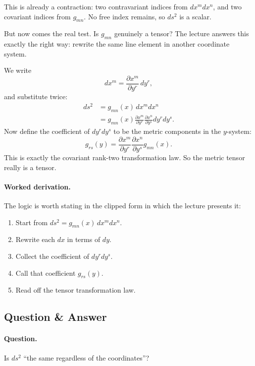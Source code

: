 This is already a contraction: two contravariant indices from \(dx^m dx^n\), and two covariant indices from \(g_{mn}\). No free index remains, so \(ds^2\) is a scalar.

But now comes the real test. Is \(g_{mn}\) genuinely a tensor? The lecture answers this exactly the right way: rewrite the same line element in another coordinate system.

We write
\begin{equation}
dx^m=\frac{\partial x^m}{\partial y^r}\,dy^r,
\end{equation}
and substitute twice:
\begin{align}
ds^2
&=g_{mn}(x)\,dx^m dx^n \\
&=
g_{mn}(x)
\frac{\partial x^m}{\partial y^r}
\frac{\partial x^n}{\partial y^s}
dy^r dy^s.
\end{align}
Now define the coefficient of \(dy^r dy^s\) to be the metric components in the \(y\)-system:
\begin{equation}
g_{rs}(y)=
\frac{\partial x^m}{\partial y^r}
\frac{\partial x^n}{\partial y^s}
g_{mn}(x).
\end{equation}
This is exactly the covariant rank-two transformation law. So the metric tensor really is a tensor.

\paragraph{Worked derivation.} The logic is worth stating in the clipped form in which the lecture presents it:
\begin{enumerate}
\item Start from \(ds^2=g_{mn}(x)\,dx^m dx^n\).
\item Rewrite each \(dx\) in terms of \(dy\).
\item Collect the coefficient of \(dy^r dy^s\).
\item Call that coefficient \(g_{rs}(y)\).
\item Read off the tensor transformation law.
\end{enumerate}

\subsection{Question \& Answer}

\paragraph{Question.} Is \(ds^2\) ``the same regardless of the coordinates''?

